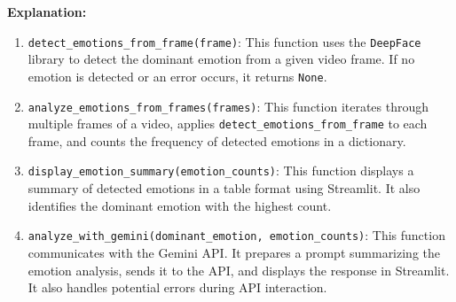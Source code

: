 \textbf{Explanation:}

\begin{enumerate}
    \item \texttt{detect\_emotions\_from\_frame(frame)}: This function uses the \texttt{DeepFace} library to detect the dominant emotion from a given video frame. If no emotion is detected or an error occurs, it returns \texttt{None}.
    \item \texttt{analyze\_emotions\_from\_frames(frames)}: This function iterates through multiple frames of a video, applies \texttt{detect\_emotions\_from\_frame} to each frame, and counts the frequency of detected emotions in a dictionary.
    \item \texttt{display\_emotion\_summary(emotion\_counts)}: This function displays a summary of detected emotions in a table format using Streamlit. It also identifies the dominant emotion with the highest count.
    \item \texttt{analyze\_with\_gemini(dominant\_emotion, emotion\_counts)}: This function communicates with the Gemini API. It prepares a prompt summarizing the emotion analysis, sends it to the API, and displays the response in Streamlit. It also handles potential errors during API interaction.
\end{enumerate}


